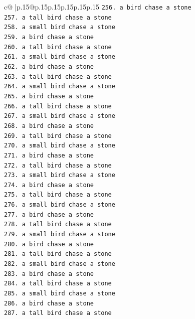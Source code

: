 \documentclass{article}
\begin{document}
{\begin{supertabular}{c@{$\;$}|p{.15\linewidth}@{}p{.15\linewidth}p{.15\linewidth}p{.15\linewidth}p{.15\linewidth}p{.15\linewidth}}
{{{\texttt{256. a bird chase a stone} \\
\texttt{257. a tall bird chase a stone} \\
\texttt{258. a small bird chase a stone} \\
\texttt{259. a bird chase a stone} \\
\texttt{260. a tall bird chase a stone} \\
\texttt{261. a small bird chase a stone} \\
\texttt{262. a bird chase a stone} \\
\texttt{263. a tall bird chase a stone} \\
\texttt{264. a small bird chase a stone} \\
\texttt{265. a bird chase a stone} \\
\texttt{266. a tall bird chase a stone} \\
\texttt{267. a small bird chase a stone} \\
\texttt{268. a bird chase a stone} \\
\texttt{269. a tall bird chase a stone} \\
\texttt{270. a small bird chase a stone} \\
\texttt{271. a bird chase a stone} \\
\texttt{272. a tall bird chase a stone} \\
\texttt{273. a small bird chase a stone} \\
\texttt{274. a bird chase a stone} \\
\texttt{275. a tall bird chase a stone} \\
\texttt{276. a small bird chase a stone} \\
\texttt{277. a bird chase a stone} \\
\texttt{278. a tall bird chase a stone} \\
\texttt{279. a small bird chase a stone} \\
\texttt{280. a bird chase a stone} \\
\texttt{281. a tall bird chase a stone} \\
\texttt{282. a small bird chase a stone} \\
\texttt{283. a bird chase a stone} \\
\texttt{284. a tall bird chase a stone} \\
\texttt{285. a small bird chase a stone} \\
\texttt{286. a bird chase a stone} \\
\texttt{287. a tall bird chase a stone} \\
}}}
\end{supertabular}}
\end{document}
